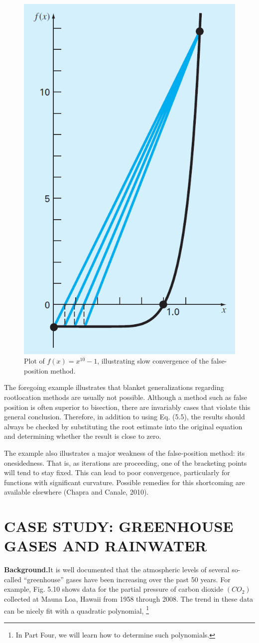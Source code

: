 \documentclass[../main.tex]{subfiles}
\begin{document}
\begin{example}
    \begin{figure}[h]
        \includegraphics[width=0.35\linewidth]{./images/fig_5_9}
        \caption{Plot of $f (x) = x^{10} - 1$, illustrating slow convergence of the false-position method.}
    \end{figure}
\end{example}

The foregoing example illustrates that blanket generalizations regarding rootlocation
methods are usually not possible. Although a method such as false position is
often superior to bisection, there are invariably cases that violate this general conclusion.
Therefore, in addition to using Eq. (5.5), the results should always be checked by substituting
the root estimate into the original equation and determining whether the result is
close to zero.

The example also illustrates a major weakness of the false-position method: its onesidedness.
That is, as iterations are proceeding, one of the bracketing points will tend to
stay fixed. This can lead to poor convergence, particularly for functions with significant
curvature. Possible remedies for this shortcoming are available elsewhere (Chapra and
Canale, 2010).\\
\bigskip

\section[CASE STUDY: GREENHOUSE GASES AND RAINWATER]{CASE STUDY: GREENHOUSE GASES AND RAINWATER}
\noindent\textbf{Background.}\quad It is well documented that the atmospheric levels of several so-called
``greenhouse'' gases have been increasing over the past 50 years. For example, Fig. 5.10
shows data for the partial pressure of carbon dioxide $(CO_2)$ collected at Mauna Loa, Hawaii
from 1958 through 2008. The trend in these data can be nicely fit with a quadratic polynomial,
\footnote{In Part Four, we will learn how to determine such polynomials.}\\
\end{document}
